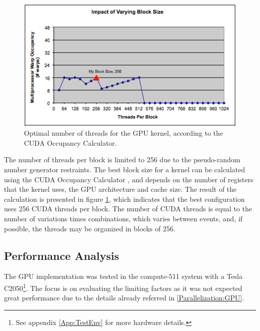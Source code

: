 \begin{figure}[!htp]
	\begin{center}
		\includegraphics[scale=0.6]{../../common/graphs/block_size_gpu.png}
		\caption{Optimal number of threads for the GPU kernel, according to the \nvidia CUDA Occupancy Calculator.}
		\label{fig:GPUCalc}
	\end{center}
\end{figure}

The number of threads per block is limited to 256 due to the pseudo-random number generator restraints. The best block size for a kernel can be calculated using the \nvidia CUDA Occupancy Calculator \cite{NVIDIA:Calculator}, and depends on the number of registers that the kernel uses, the GPU architecture and cache size. The result of the calculation is presented in figure \ref{fig:GPUCalc}, which indicates that the best configuration uses 256 CUDA threads per block. The number of CUDA threads is equal to the number of variations times combinations, which varies between events, and, if possible, the threads may be organized in blocks of 256.

\subsection{Performance Analysis}
\label{GPUPerformance}

The GPU implementation was tested in the compute-511 system with a \nvidia Tesla C2050\footnote{See appendix \ref{App:TestEnv} for more hardware details.}. The focus is on evaluating the limiting factors as it was not expected great performance due to the details already referred in \ref{Parallelization:GPU}.

